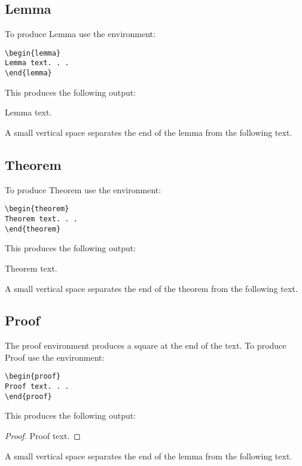 \documentclass{clv3}
\begin{document}
\subsection{Lemma}

To produce Lemma use the environment:

\begin{verbatim}
\begin{lemma}
Lemma text. . .
\end{lemma}
\end{verbatim}

This produces the following output:
\begin{lemma}\label{lem}
Lemma text.
\end{lemma}
A small vertical space separates the end of the lemma
from the following text.

\subsection{Theorem}

To produce Theorem use the environment:

\begin{verbatim}
\begin{theorem}
Theorem text. . .
\end{theorem}
\end{verbatim}

This produces the following output:
\begin{theorem}\label{thm}
Theorem text.
\end{theorem}
\noindent
A small vertical space separates the end of the theorem
from the following text.

\subsection{Proof}

The proof environment produces a square at the end of the text. To produce Proof
use the environment:

\begin{verbatim}
\begin{proof}
Proof text. . .
\end{proof}
\end{verbatim}

This produces the following output:
\begin{proof}\label{proof}
Proof text.
\end{proof}
A small vertical space separates the end of the lemma
from the following text.
\end{document}

